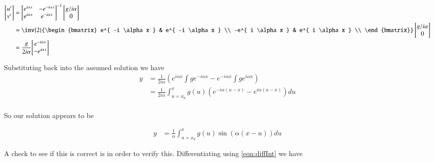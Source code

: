 \documentclass{article}
\begin{document}
\begin{align*}
\begin{bmatrix}
u' \\
v' \\
\end{bmatrix}
&=
{\begin{bmatrix}
 e^{ i \alpha x } &- e^{ -i \alpha x } \\
 e^{ i \alpha x } &  e^{ -i \alpha x } \\
\end{bmatrix}}^{-1}
\begin{bmatrix}
{g}/{i \alpha} \\
0 \\
\end{bmatrix} \\
&=
\inv{2}
{\begin{bmatrix}
 e^{ -i \alpha x } & e^{ -i \alpha x } \\
 -e^{ i \alpha x } &  e^{ i \alpha x } \\
\end{bmatrix}}
\begin{bmatrix}
{g}/{i \alpha} \\
0 \\
\end{bmatrix} \\
&=
\frac{g}{2 i \alpha}
{\begin{bmatrix}
 e^{ -i \alpha x } \\
 -e^{ i \alpha x } \\
\end{bmatrix}}
\end{align*}

Substituting back into the assumed solution we have
\begin{align*}
y
&= \frac{1}{2 i \alpha} \left(
  e^{ i \alpha x } \int g e^{ -i \alpha x }
- e^{ -i \alpha x } \int g e^{ i \alpha x }
\right) \\
&= \frac{1}{2 i \alpha} \int_{u=x_0}^x g(u) \left( e^{ -i \alpha (u-x) } -e^{ i \alpha (u-x) } \right) du \\
\end{align*}

So our solution appears to be

\begin{align}\label{eqn:solutionToWaveNumberDomainEquation}
y &= \frac{1}{\alpha} \int_{u=x_0}^x g(u) \sin( \alpha(x-u) ) du
\end{align}

A check to see if this is correct is in order to verify this.  Differentiating using \ref{eqn:diffInt} we have
\end{document}
